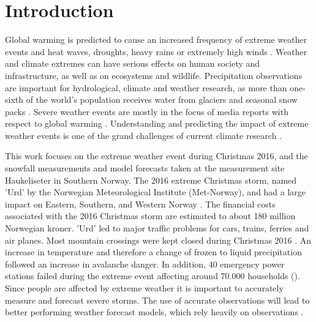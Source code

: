 \chapter{Introduction}
\label{ch:intro}
Global warming is predicted to cause an increased frequency of extreme weather events and heat waves, droughts, heavy rains or extremely high winds \citep{hansen_warmer_2014}. Weather and climate extremes can have serious effects on human society and infrastructure, as well as on ecosystems and wildlife.
Precipitation observations are important for hydrological, climate and weather research, as more than one-sixth of the world's population receives water from glaciers and seasonal snow packs \citep{barnett_potential_2005}. Severe weather events are mostly in the focus of media reports with respect to global warming \citep{meehl_introduction_2000}. Understanding and predicting the impact of extreme weather events is one of the grand challenges of current climate research \citep{stocker_working_2013,field_summary_2014}.
\par\medskip
\noindent
This work focuses on the extreme weather event during Christmas 2016, and the snowfall measurements and model forecasts taken at the measurement site Haukeliseter in Southern Norway. The 2016 extreme Christmas storm, named 'Urd' by the Norwegian Meteorological Institute (Met-Norway), and had a large impact on Eastern, Southern, and Western Norway \citep{olsen_ekstremvaerrapport._2017}. 
The financial costs associated with the 2016 Christmas storm are estimated to about 180 million Norwegian kroner. 'Urd' led to major traffic problems for cars, trains, ferries and air planes. Most mountain crossings were kept closed during Christmas 2016 \citep{olsen_ekstremvaerrapport._2017}. An increase in temperature and therefore a change of frozen to liquid precipitation followed an increase in avalanche danger. In addition, 40 emergency power stations failed during the extreme event affecting around 70.000 households ().
Since people are affected by extreme weather it is important to accurately measure and forecast severe storms. The use of accurate observations will lead to better performing weather forecast models, which rely heavily on observations \citep{joos_influence_2012}. 
